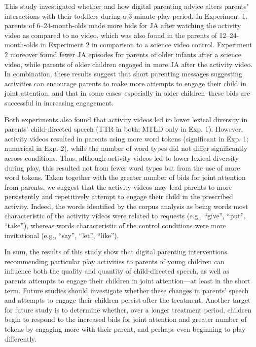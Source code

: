 \documentclass[man,floatsintext]{apa6}
\begin{document}
This study investigated whether and how digital parenting advice alters parents' interactions with their toddlers during a 3-minute play period.
In Experiment 1, parents of 6--24-month-olds made more bids for JA after watching the activity video as compared to no video, which was also found in the parents of 12--24-month-olds in Experiment 2 in comparison to a science video control.
Experiment 2 moreover found fewer JA episodes for parents of older infants after a science video, while parents of older children engaged in more JA after the activity video.
In combination, these results suggest that short parenting messages suggesting activities can encourage parents to make more attempts to engage their child in joint attention, and that in some cases--especially in older children--these bids are successful in increasing engagement.

Both experiments also found that activity videos led to lower lexical diversity in parents' child-directed speech (TTR in both; MTLD only in Exp. 1). However, activity videos resulted in parents using more word tokens (significant in Exp. 1; numerical in Exp. 2), while the number of word types did not differ significantly across conditions.
Thus, although activity videos led to lower lexical diversity during play, this resulted not from fewer word types but from the use of more word tokens.
Taken together with the greater number of bids for joint attention from parents, we suggest that the activity videos may lead parents to more persistently and repetitively attempt to engage their child in the prescribed activity.
Indeed, the words identified by the corpus analysis as being words most characteristic of the activity videos were related to requests (e.g., \enquote{give}, \enquote{put}, \enquote{take}), whereas words characteristic of the control conditions were more invitational (e.g., \enquote{say}, \enquote{let}, \enquote{like}).

In sum, the results of this study show that digital parenting interventions recommending particular play activities to parents of young children can influence both the quality and quantity of child-directed speech, as well as parents attempts to engage their children in joint attention---at least in the short term.
Future studies should investigate whether these changes in parents' speech and attempts to engage their children persist after the treatment.
Another target for future study is to determine whether, over a longer treatment period, children begin to respond to the increased bids for joint attention and greater number of tokens by engaging more with their parent, and perhaps even beginning to play differently.
\end{document}
